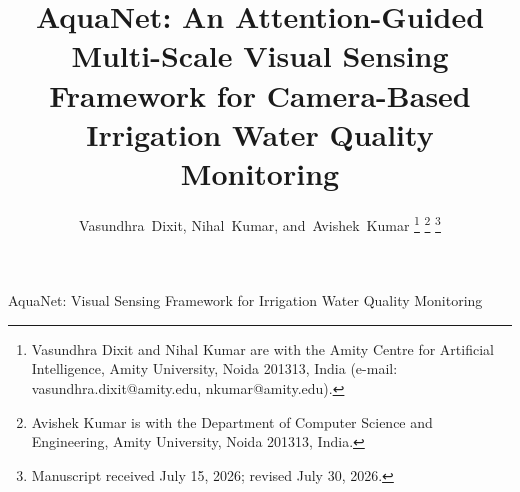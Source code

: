 \documentclass[journal]{IEEEtran}
\newcommand{\method}{AquaNet}
\begin{document}
\title{\method{}: An Attention-Guided Multi-Scale Visual Sensing Framework for Camera-Based Irrigation Water Quality Monitoring}

\author{
Vasundhra~Dixit,
Nihal~Kumar,
and~Avishek~Kumar%
\thanks{Vasundhra Dixit and Nihal Kumar are with the Amity Centre for Artificial Intelligence, Amity University, Noida 201313, India (e-mail: vasundhra.dixit@amity.edu, nkumar@amity.edu).}%
\thanks{Avishek Kumar is with the Department of Computer Science and Engineering, Amity University, Noida 201313, India.}%
\thanks{Manuscript received July 15, 2026; revised July 30, 2026.}
}

%
{\method{}: Visual Sensing Framework for Irrigation Water Quality Monitoring}

\maketitle
\end{document}
